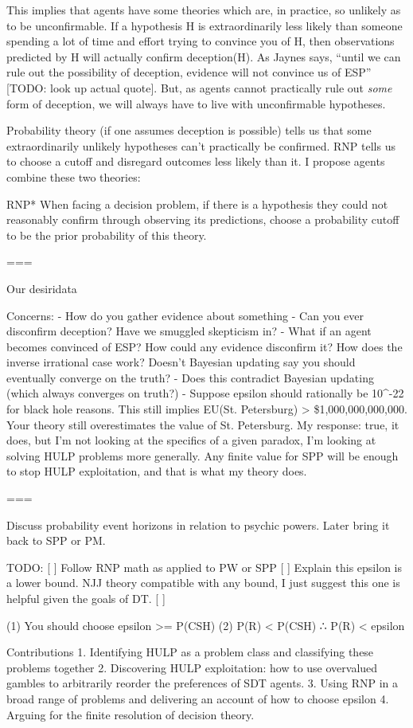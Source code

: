 This implies that agents have some theories which are, in practice, so unlikely as to be unconfirmable. If a hypothesis H is extraordinarily less likely than someone spending a lot of time and effort trying to convince you of H, then observations predicted by H will actually confirm deception(H). As Jaynes says, ``until we can rule out the possibility of deception, evidence will not convince us of ESP'' [TODO: look up actual quote]. But, as agents cannot practically rule out \textit{some} form of deception, we will always have to live with unconfirmable hypotheses.

Probability theory (if one assumes deception is possible) tells us that some extraordinarily unlikely hypotheses can't practically be confirmed. RNP tells us to choose a cutoff and disregard outcomes less likely than it. I propose agents combine these two theories:

RNP* When facing a decision problem, if there is a hypothesis they could not reasonably confirm through observing its predictions, choose a probability cutoff \epsilon to be the prior probability of this theory.

=== 

Our desiridata

Concerns:
 - How do you gather evidence about something
 - Can you ever disconfirm deception? Have we smuggled skepticism in?
 - What if an agent becomes convinced of ESP? How could any evidence disconfirm it? How does the inverse irrational case work? Doesn't Bayesian updating say you should eventually converge on the truth?
 - Does this contradict Bayesian updating (which always converges on truth?)
 - Suppose epsilon should rationally be 10^-22 for black hole reasons. This still implies EU(St. Petersburg) > \$1,000,000,000,000. Your theory still overestimates the value of St. Petersburg. My response: true, it does, but I'm not looking at the specifics of a given paradox, I'm looking at solving HULP problems more generally. Any finite value for SPP will be enough to stop HULP exploitation, and that is what my theory does.

===

Discuss probability event horizons in relation to psychic powers. Later bring it back to SPP or PM.

TODO:
[ ] Follow RNP math as applied to PW or SPP
[ ] Explain this epsilon is a lower bound. NJJ theory compatible with any bound, I just suggest this one is helpful given the goals of DT.
[ ] 

(1) You should choose epsilon >= P(CSH)
(2) P(R) < P(CSH)
 ∴  P(R) < epsilon

Contributions
1. Identifying HULP as a problem class and classifying these problems together
2. Discovering HULP exploitation: how to use overvalued gambles to arbitrarily reorder the preferences of SDT agents.
3. Using RNP in a broad range of problems and delivering an account of how to choose epsilon 
4. Arguing for the finite resolution of decision theory.